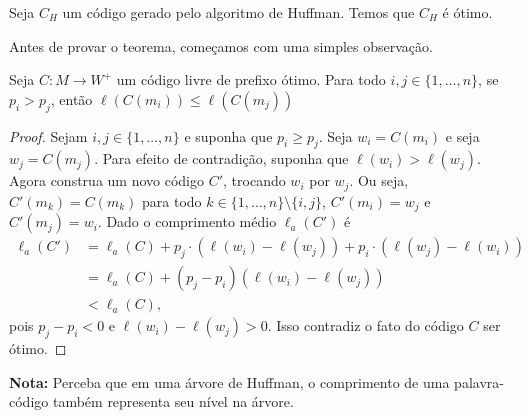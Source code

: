 \begin{theorem}
  \label{thm:otimo_huffman}
  Seja $C_{H}$ um código gerado pelo algoritmo de Huffman. Temos que
  $C_{H}$ é ótimo.
\end{theorem}

Antes de provar o teorema, começamos com uma simples observação.
  
\begin{lemma} \label{lemma:dist_prob_avg_size} Seja $C:M\to W^+$ um código livre de prefixo ótimo. Para todo $i,j \in\{1,\dotsc, n\}$, se $p_i > p_j$, então $\ell(C(m_i)) \leq \ell(C(m_j))$
\end{lemma}
  \begin{proof}
    Sejam $i,j \in\{1,\dotsc, n\}$ e suponha que $p_i \geq p_j$.  Seja
    $w_i = C(m_i)$ e seja $w_j = C(m_j)$. Para efeito de contradição,
    suponha que $\ell(w_i) > \ell(w_j)$.  Agora construa um novo código $C'$,
    trocando $w_i$ por $w_j$. Ou seja, $C'(m_k) = C(m_k)$ para todo $k
    \in \{1,\dotsc, n\} \setminus \{i,j\}$, $C'(m_i) = w_j$ e $C'(m_j)
    = w_i$.  Dado o comprimento médio $\ell_a(C')$ é
 \begin{align*}
   \ell_a(C') &= \ell_a(C) + p_j\cdot(\ell(w_i) - \ell(w_j)) + p_i\cdot(\ell(w_j) - \ell(w_i)) \\
   &= \ell_a(C) + (p_j - p_i)(\ell(w_i) - \ell(w_j))\\
   &< \ell_a(C),
 \end{align*}
 pois $p_j - p_i < 0$ e $\ell(w_i) - \ell(w_j)>0$. Isso contradiz o fato do
 código $C$ ser ótimo.
  \end{proof}

\noindent \textbf{Nota:} Perceba que em uma árvore de Huffman, o comprimento de uma palavra-código também representa seu nível na árvore.

